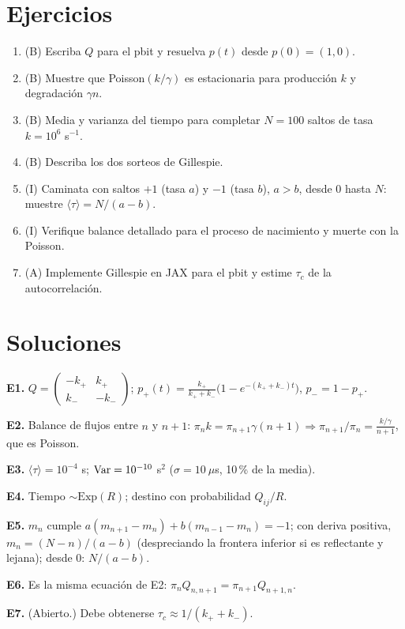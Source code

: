 \documentclass[11pt,a4paper]{article}
\begin{document}

\section{Ejercicios}
\begin{enumerate}[label=\textbf{E\arabic*.}]
\item (B) Escriba $Q$ para el pbit y resuelva $p(t)$ desde $p(0)=(1,0)$.
\item (B) Muestre que Poisson$(k/\gamma)$ es estacionaria para producción $k$ y degradación $\gamma n$.
\item (B) Media y varianza del tiempo para completar $N=100$ saltos de tasa $k=10^6$ s$^{-1}$.
\item (B) Describa los dos sorteos de Gillespie.
\item (I) Caminata con saltos $+1$ (tasa $a$) y $-1$ (tasa $b$), $a>b$, desde 0 hasta $N$: muestre $\langle\tau\rangle=N/(a-b)$.
\item (I) Verifique balance detallado para el proceso de nacimiento y muerte con la Poisson.
\item (A) Implemente Gillespie en JAX para el pbit y estime $\tau_c$ de la autocorrelación.
\end{enumerate}

\section{Soluciones}
\begin{solucion}
\textbf{E1.} $Q=\begin{pmatrix}-k_+&k_+\\k_-&-k_-\end{pmatrix}$; $p_{+}(t)=\frac{k_+}{k_++k_-}\big(1-e^{-(k_++k_-)t}\big)$, $p_-=1-p_+$.

\textbf{E2.} Balance de flujos entre $n$ y $n+1$: $\pi_nk=\pi_{n+1}\gamma(n+1)\Rightarrow\pi_{n+1}/\pi_n=\frac{k/\gamma}{n+1}$, que es Poisson.

\textbf{E3.} $\langle\tau\rangle=10^{-4}$ s; $\operatorname{Var}=10^{-10}$ s$^2$ ($\sigma=10\ \mu$s, 10\,\% de la media).

\textbf{E4.} Tiempo $\sim\mathrm{Exp}(R)$; destino con probabilidad $Q_{ij}/R$.

\textbf{E5.} $m_n$ cumple $a(m_{n+1}-m_n)+b(m_{n-1}-m_n)=-1$; con deriva positiva, $m_n=(N-n)/(a-b)$ (despreciando la frontera inferior si es reflectante y lejana); desde $0$: $N/(a-b)$.

\textbf{E6.} Es la misma ecuación de E2: $\pi_nQ_{n,n+1}=\pi_{n+1}Q_{n+1,n}$.

\textbf{E7.} (Abierto.) Debe obtenerse $\tau_c\approx1/(k_++k_-)$.
\end{solucion}
\end{document}
